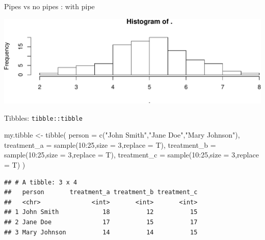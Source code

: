 \documentclass[14pt,ignorenonframetext,]{bredelebeamer}
\newenvironment{Shaded}{\begin{snugshade}}{\end{snugshade}}
\newcommand{\KeywordTok}[1]{\textcolor[rgb]{0.94,0.87,0.69}{#1}}
\newcommand{\DataTypeTok}[1]{\textcolor[rgb]{0.87,0.87,0.75}{#1}}
\newcommand{\DecValTok}[1]{\textcolor[rgb]{0.86,0.86,0.80}{#1}}
\newcommand{\StringTok}[1]{\textcolor[rgb]{0.80,0.58,0.58}{#1}}
\newcommand{\OperatorTok}[1]{\textcolor[rgb]{0.94,0.94,0.82}{#1}}
\newcommand{\NormalTok}[1]{\textcolor[rgb]{0.80,0.80,0.80}{#1}}
\begin{document}
\begin{frame}[fragile]{Pipes vs no pipes : with pipe}

\begin{Shaded}
\end{Shaded}

\includegraphics{tidyverse_28_03_files/figure-beamer/histo3-1.pdf}

\end{frame}

\begin{frame}[fragile]{Tibbles: \texttt{tibble::tibble}}

\begin{Shaded}
\begin{Highlighting}[]
\NormalTok{my.tibble <-}\StringTok{ }\KeywordTok{tibble}\NormalTok{(}
    \DataTypeTok{person =} \KeywordTok{c}\NormalTok{(}\StringTok{"John Smith"}\NormalTok{,}\StringTok{"Jane Doe"}\NormalTok{,}\StringTok{"Mary Johnson"}\NormalTok{),}
    \DataTypeTok{treatment_a =} \KeywordTok{sample}\NormalTok{(}\DecValTok{10}\OperatorTok{:}\DecValTok{25}\NormalTok{,}\DataTypeTok{size =} \DecValTok{3}\NormalTok{,}\DataTypeTok{replace =}\NormalTok{ T),}
    \DataTypeTok{treatment_b =} \KeywordTok{sample}\NormalTok{(}\DecValTok{10}\OperatorTok{:}\DecValTok{25}\NormalTok{,}\DataTypeTok{size =} \DecValTok{3}\NormalTok{,}\DataTypeTok{replace =}\NormalTok{ T),}
    \DataTypeTok{treatment_c =} \KeywordTok{sample}\NormalTok{(}\DecValTok{10}\OperatorTok{:}\DecValTok{25}\NormalTok{,}\DataTypeTok{size =} \DecValTok{3}\NormalTok{,}\DataTypeTok{replace =}\NormalTok{ T)}
\NormalTok{)}
\end{Highlighting}
\end{Shaded}

\begin{verbatim}
## # A tibble: 3 x 4
##   person       treatment_a treatment_b treatment_c
##   <chr>              <int>       <int>       <int>
## 1 John Smith            18          12          15
## 2 Jane Doe              17          15          17
## 3 Mary Johnson          14          14          15
\end{verbatim}

\end{frame}
\end{document}

